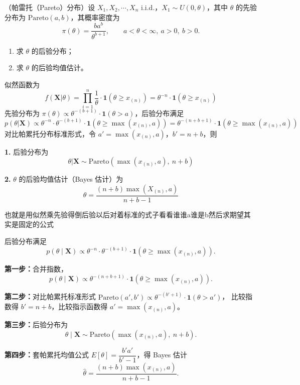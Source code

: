 \begin{homework}[20]
（帕雷托（Pareto）分布）设 \(X_1,X_2,\cdots,X_n\) i.i.d.，\(X_1\sim U(0,\theta)\)，其中 \(\theta\) 的先验分布为 \(\mathrm{Pareto}(a,b)\)，其概率密度为
\[
\pi(\theta)=\frac{ba^b}{\theta^{b+1}},\qquad a<\theta<\infty,\ a>0,\ b>0.
\]

\begin{enumerate}
    \item 求 \(\theta\) 的后验分布；
    \item 求 \(\theta\) 的后验均值估计。
\end{enumerate}
\begin{solution}
似然函数为
\[
f(\boldsymbol{X}|\theta) = \prod_{i=1}^n \frac{1}{\theta}\cdot\mathbf{1}(\theta \geq x_{(n)}) = \theta^{-n}\cdot\mathbf{1}(\theta \geq x_{(n)})
\]
先验分布为 $\pi(\theta) \propto \theta^{-(b+1)}\cdot\mathbf{1}(\theta > a)$，后验分布满足
\[
p(\theta|\boldsymbol{X}) \propto \theta^{-n}\cdot\theta^{-(b+1)}\cdot\mathbf{1}(\theta \geq \max(x_{(n)},a)) = \theta^{-(n+b+1)}\cdot\mathbf{1}(\theta \geq \max(x_{(n)},a))
\]
对比帕累托分布标准形式，令 $a' = \max(x_{(n)},a)$，$b' = n+b$，则

\textbf{1.} 后验分布为
\[
\theta|\boldsymbol{X} \sim \mathrm{Pareto}\!\left(\max(x_{(n)},a),\ n+b\right)
\]

\textbf{2.} $\theta$ 的后验均值估计（Bayes 估计）为
\[
\hat{\theta} = \frac{(n+b)\max(X_{(n)},a)}{n+b-1}
\]
\end{solution}
\end{homework}
\begin{dxtips}
    也就是用似然乘先验得倒后验以后对着标准的式子看看谁谁a谁是b然后求期望其实是固定的公式
\end{dxtips}
\begin{note}
后验分布满足
\[
p(\theta\mid\boldsymbol{X})\propto\theta^{-n}\cdot\theta^{-(b+1)}\cdot\mathbf{1}(\theta\geq\max(x_{(n)},a)).
\]

\textbf{第一步：}合并指数，
\[
p(\theta\mid\boldsymbol{X})\propto\theta^{-(n+b+1)}\cdot\mathbf{1}(\theta\geq\max(x_{(n)},a)).
\]

\textbf{第二步：}对比帕累托标准形式
$\mathrm{Pareto}(a',b')\propto\theta^{-(b'+1)}\cdot\mathbf{1}(\theta>a')$，
比较指数得 $b'=n+b$，比较指示函数得 $a'=\max(x_{(n)},a)$。

\textbf{第三步：}后验分布为
\[
\theta\mid\boldsymbol{X}\sim\mathrm{Pareto}\!\left(\max(x_{(n)},a),\ n+b\right).
\]

\textbf{第四步：}套帕累托均值公式 $E[\theta]=\dfrac{b'a'}{b'-1}$，得 Bayes 估计
\[
\hat{\theta}=\frac{(n+b)\max(x_{(n)},a)}{n+b-1}.
\]
\end{note}
